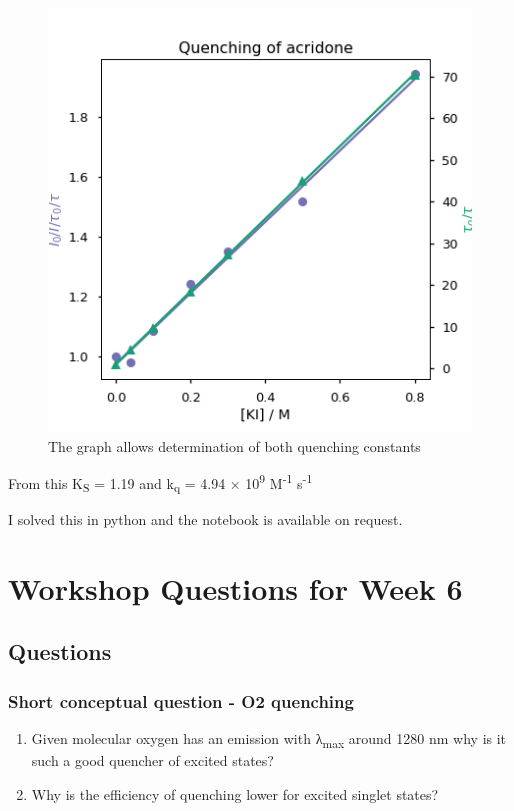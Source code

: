 \documentclass[
]{book}
\begin{document}
\begin{figure}

{\centering \includegraphics[width=0.7\linewidth]{images/acridonequench} 

}

\caption{The graph allows determination of both quenching constants}\label{fig:acridonequench}
\end{figure}

From this K\textsubscript{S} = 1.19 and k\textsubscript{q} = 4.94 × 10\textsuperscript{9} M\textsuperscript{-1} s\textsuperscript{-1}

I solved this in python and the notebook is available on request.

\hypertarget{ch:Workshop5}{%
\chapter{Workshop Questions for Week 6}\label{ch:Workshop5}}

\hypertarget{questions-2}{%
\section{Questions}\label{questions-2}}

\hypertarget{sec:O2quench_question}{%
\subsection{Short conceptual question - O2 quenching}\label{sec:O2quench_question}}

\begin{enumerate}
\def\labelenumi{\arabic{enumi}.}
\item
  Given molecular oxygen has an emission with λ\textsubscript{max} around 1280 nm why is it such a good quencher of excited states?
\item
  Why is the efficiency of quenching lower for excited singlet states?
\end{enumerate}
\end{document}
